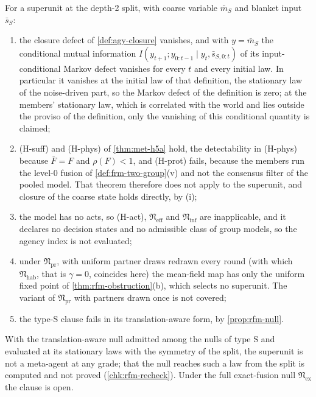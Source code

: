 \begin{proposition}\label{prop:rfm-verdict}
For a superunit at the depth-2 split, with coarse variable $\bar m_S$ and blanket input $\bar s_S$:
\begin{enumerate}
\item[(i)] the closure defect of \cref{def:agy-closure} vanishes, and with $y=\bar m_S$ the conditional mutual information $I(y_{t+1};y_{0:t-1}\mid y_t,\bar s_{S,0:t})$ of its input-conditional Markov defect vanishes for every $t$ and every initial law. In particular it vanishes at the initial law of that definition, the stationary law of the noise-driven part, so the Markov defect of the definition is zero; at the members' stationary law, which is correlated with the world and lies outside the proviso of the definition, only the vanishing of this conditional quantity is claimed;
\item[(ii)] (H-suff) and (H-phys) of \cref{thm:met-h5a} hold, the detectability in (H-phys) because $\bar F=F$ and $\rho(F)<1$, and (H-prot) fails, because the members run the level-0 fusion of \cref{def:frm-two-group}(v) and not the consensus filter of the pooled model. That theorem therefore does not apply to the superunit, and closure of the coarse state holds directly, by (i);
\item[(iii)] the model has no acts, so (H-act), $\mathfrak N_{\mathrm{eff}}$ and $\mathfrak N_{\mathrm{inf}}$ are inapplicable, and it declares no decision states and no admissible class of group models, so the agency index is not evaluated;
\item[(iv)] under $\mathfrak N_{\mathrm{pr}}$, with uniform partner draws redrawn every round (with which $\mathfrak N_{\mathrm{hab}}$, that is $\gamma=0$, coincides here) the mean-field map has only the uniform fixed point of \cref{thm:rfm-obstruction}(b), which selects no superunit. The variant of $\mathfrak N_{\mathrm{pr}}$ with partners drawn once is not covered;
\item[(v)] the type-S clause fails in its translation-aware form, by \cref{prop:rfm-null}.
\end{enumerate}
With the translation-aware null admitted among the nulls of type S and evaluated at its stationary laws with the symmetry of the split, the superunit is not a meta-agent at any grade; that the null reaches such a law from the split is computed and not proved (\cref{chk:rfm-recheck}). Under the full exact-fusion null $\mathfrak N_{\mathrm{ex}}$ the clause is open.
\end{proposition}

